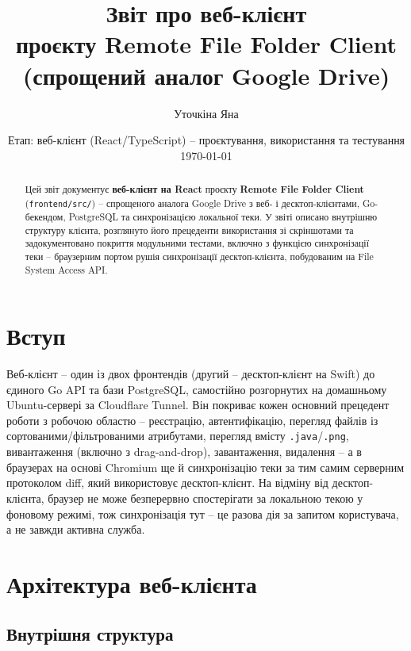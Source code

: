 \documentclass[12pt,a4paper]{article}
\title{\textbf{Звіт про веб-клієнт\\[2pt] \large проєкту Remote File Folder Client\\(спрощений аналог Google Drive)}}
\author{Уточкіна Яна}
\date{Етап: веб-клієнт (React/TypeScript) -- проєктування, використання та тестування \\ \today}
\begin{document}
\maketitle

\begin{abstract}
\noindent
Цей звіт документує \textbf{веб-клієнт на React} проєкту \textbf{Remote File Folder Client} (\texttt{frontend/src/}) -- спрощеного аналога Google Drive з веб- і десктоп-клієнтами, Go-бекендом, PostgreSQL та синхронізацією локальної теки. У звіті описано внутрішню структуру клієнта, розглянуто його прецеденти використання зі скріншотами та задокументовано покриття модульними тестами, включно з функцією синхронізації теки -- браузерним портом рушія синхронізації десктоп-клієнта, побудованим на File System Access API.
\end{abstract}

\tableofcontents
\newpage

\section{Вступ}

Веб-клієнт -- один із двох фронтендів (другий -- десктоп-клієнт на Swift) до єдиного Go API та бази PostgreSQL, самостійно розгорнутих на домашньому Ubuntu-сервері за Cloudflare Tunnel. Він покриває кожен основний прецедент роботи з робочою областю -- реєстрацію, автентифікацію, перегляд файлів із сортованими/фільтрованими атрибутами, перегляд вмісту \texttt{.java}/\texttt{.png}, вивантаження (включно з drag-and-drop), завантаження, видалення -- а в браузерах на основі Chromium ще й синхронізацію теки за тим самим серверним протоколом diff, який використовує десктоп-клієнт. На відміну від десктоп-клієнта, браузер не може безперервно спостерігати за локальною текою у фоновому режимі, тож синхронізація тут -- це разова дія за запитом користувача, а не завжди активна служба.

\section{Архітектура веб-клієнта}

\subsection{Внутрішня структура}
\end{document}

